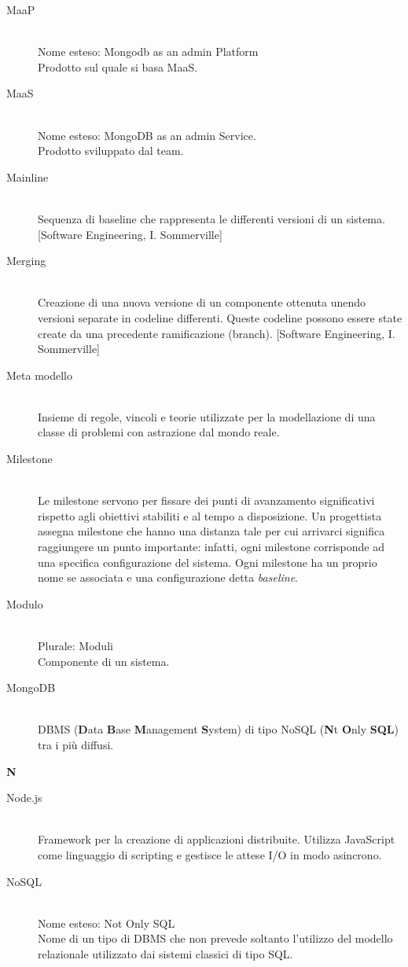 \begin{description}\item[MaaP] \hfill \\
Nome esteso: Mongodb as an admin Platform\\ 
Prodotto sul quale si basa MaaS.
 \item[MaaS] \hfill \\
Nome esteso: MongoDB as an admin Service.\\ 
Prodotto sviluppato dal team.
 \item[Mainline] \hfill \\
Sequenza di baseline che rappresenta le differenti versioni di un sistema. [Software Engineering, I. Sommerville]
 \item[Merging] \hfill \\
Creazione di una nuova versione di un componente ottenuta unendo versioni separate in codeline differenti. Queste codeline possono essere state create da una precedente ramificazione (branch). [Software Engineering, I. Sommerville]
 \item[Meta modello] \hfill \\
Insieme di regole, vincoli e teorie utilizzate per la modellazione di una classe di problemi con astrazione dal mondo reale.
 \item[Milestone] \hfill \\
Le milestone servono per fissare dei punti di avanzamento significativi rispetto agli obiettivi stabiliti e al tempo a disposizione. Un progettista assegna milestone che hanno una distanza tale per cui arrivarci significa raggiungere un punto importante: infatti, ogni milestone corrisponde ad una specifica configurazione del sistema. Ogni milestone ha un proprio nome se associata e una configurazione detta \textit{baseline}.
 \item[Modulo] \hfill \\
Plurale: Moduli\\ 
Componente di un sistema.
 \item[MongoDB] \hfill \\
DBMS (\textbf{D}ata \textbf{B}ase \textbf{M}anagement
		\textbf{S}ystem) di tipo NoSQL (\textbf{N}t \textbf{O}nly \textbf{SQL}) tra i più diffusi.
 \end{description}
\newpage 
\begin{center}\textbf{\Huge{N}}\end{center}
\begin{description}\item[Node.js] \hfill \\
Framework per la creazione di applicazioni distribuite. Utilizza JavaScript come linguaggio di scripting e gestisce le attese I/O in modo asincrono.
 \item[NoSQL] \hfill \\
Nome esteso: Not Only SQL\\ 
Nome di un tipo di DBMS che non prevede soltanto l'utilizzo
		del modello relazionale utilizzato dai sistemi classici di tipo SQL.
 \end{description}
